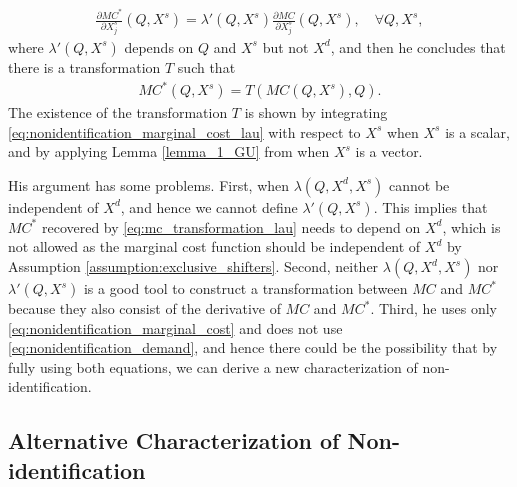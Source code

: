\documentclass[11pt, a4paper]{article}
\theoremstyle{remark}
\begin{document}
\begin{align}
    \frac{\partial MC^{*}}{\partial X^{s}_j}(Q, X^{s}) = \lambda'(Q, X^{s}) \frac{\partial MC}{\partial X^{s}_j}(Q, X^{s}),\quad \forall Q, X^{s}, \label{eq:nonidentification_marginal_cost_lau}
\end{align}
where $\lambda'(Q, X^{s})$ depends on $Q$ and $X^{s}$ but not $X^{d}$, and then he concludes that there is a transformation $T$ such that 
\begin{align}
    MC^{*}(Q, X^{s}) = T(MC(Q, X^{s}), Q). \label{eq:mc_transformation_lau}
\end{align}
The existence of the transformation $T$ is shown by integrating \eqref{eq:nonidentification_marginal_cost_lau} with respect to $X^{s}$ when $X^{s}$ is a scalar, and by applying Lemma \ref{lemma_1_GU} from \citet{goldmanNote1964} when $X^{s}$ is a vector.

His argument has some problems.
First, when $\lambda(Q, X^{d}, X^{s})$ cannot be independent of $X^{d}$, and hence we cannot define $\lambda'(Q, X^{s})$.
This implies that  $MC^{*}$ recovered by \eqref{eq:mc_transformation_lau} needs to depend on $X^{d}$, which is not allowed as the marginal cost function should be independent of $X^{d}$ by Assumption \ref{assumption:exclusive_shifters}.
Second, neither $\lambda(Q, X^{d}, X^{s})$ nor $\lambda'(Q, X^{s})$ is a good tool to construct a transformation between $MC$ and $MC^{*}$ because they also consist of the derivative of $MC$ and $MC^{*}$.
Third, he uses only \eqref{eq:nonidentification_marginal_cost} and does not use \eqref{eq:nonidentification_demand}, and hence there could be the possibility that by fully using both equations, we can derive a new characterization of non-identification.





\subsection{Alternative Characterization of Non-identification}
\end{document}
